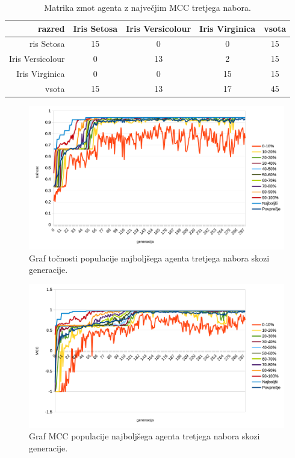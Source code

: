 \begin{table}[H]
    \centering
    \begin{tabular}{||rcccc||}
        \hline
        razred           & Iris Setosa & Iris Versicolour & Iris Virginica & vsota \\ \hline
        ris Setosa       & 15          & 0                & 0              & 15    \\ \hline
        Iris Versicolour & 0           & 13               & 2              & 15    \\ \hline
        Iris Virginica   & 0           & 0                & 15             & 15    \\ \hline
        vsota            & 15          & 13               & 17             & 45    \\ \hline
    \end{tabular}
    \caption{Matrika zmot agenta z največjim MCC tretjega nabora.}
    \label{tab:iris_mcc_3}
\end{table}

\begin{figure}[H]
    \begin{center}
        \includegraphics[width=13cm]{iris/3/acc}
    \end{center}
    \caption{Graf točnosti populacije najboljšega agenta tretjega nabora skozi generacije.}
    \label{fig:iris_acc_3}
\end{figure}

\begin{figure}[H]
    \begin{center}
        \includegraphics[width=13cm]{iris/3/mcc}
    \end{center}
    \caption{Graf MCC populacije najboljšega agenta tretjega nabora skozi generacije.}
    \label{fig:iris_mcc_3}
\end{figure}

